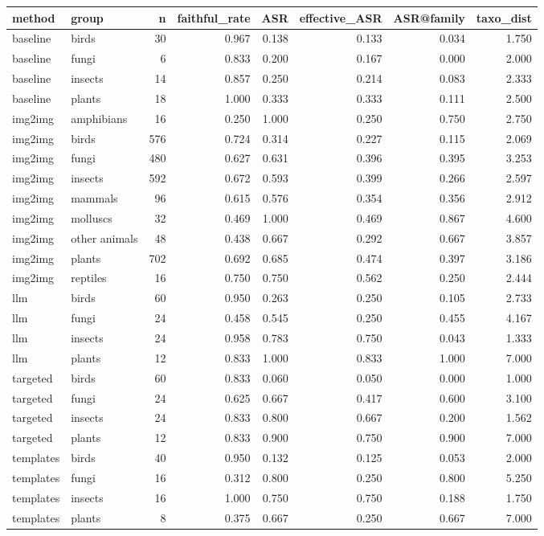 \begin{tabular}{llrrrrrr}
\toprule
method & group & n & faithful_rate & ASR & effective_ASR & ASR@family & taxo_dist \\
\midrule
baseline & birds & 30 & 0.967 & 0.138 & 0.133 & 0.034 & 1.750 \\
baseline & fungi & 6 & 0.833 & 0.200 & 0.167 & 0.000 & 2.000 \\
baseline & insects & 14 & 0.857 & 0.250 & 0.214 & 0.083 & 2.333 \\
baseline & plants & 18 & 1.000 & 0.333 & 0.333 & 0.111 & 2.500 \\
img2img & amphibians & 16 & 0.250 & 1.000 & 0.250 & 0.750 & 2.750 \\
img2img & birds & 576 & 0.724 & 0.314 & 0.227 & 0.115 & 2.069 \\
img2img & fungi & 480 & 0.627 & 0.631 & 0.396 & 0.395 & 3.253 \\
img2img & insects & 592 & 0.672 & 0.593 & 0.399 & 0.266 & 2.597 \\
img2img & mammals & 96 & 0.615 & 0.576 & 0.354 & 0.356 & 2.912 \\
img2img & molluscs & 32 & 0.469 & 1.000 & 0.469 & 0.867 & 4.600 \\
img2img & other animals & 48 & 0.438 & 0.667 & 0.292 & 0.667 & 3.857 \\
img2img & plants & 702 & 0.692 & 0.685 & 0.474 & 0.397 & 3.186 \\
img2img & reptiles & 16 & 0.750 & 0.750 & 0.562 & 0.250 & 2.444 \\
llm & birds & 60 & 0.950 & 0.263 & 0.250 & 0.105 & 2.733 \\
llm & fungi & 24 & 0.458 & 0.545 & 0.250 & 0.455 & 4.167 \\
llm & insects & 24 & 0.958 & 0.783 & 0.750 & 0.043 & 1.333 \\
llm & plants & 12 & 0.833 & 1.000 & 0.833 & 1.000 & 7.000 \\
targeted & birds & 60 & 0.833 & 0.060 & 0.050 & 0.000 & 1.000 \\
targeted & fungi & 24 & 0.625 & 0.667 & 0.417 & 0.600 & 3.100 \\
targeted & insects & 24 & 0.833 & 0.800 & 0.667 & 0.200 & 1.562 \\
targeted & plants & 12 & 0.833 & 0.900 & 0.750 & 0.900 & 7.000 \\
templates & birds & 40 & 0.950 & 0.132 & 0.125 & 0.053 & 2.000 \\
templates & fungi & 16 & 0.312 & 0.800 & 0.250 & 0.800 & 5.250 \\
templates & insects & 16 & 1.000 & 0.750 & 0.750 & 0.188 & 1.750 \\
templates & plants & 8 & 0.375 & 0.667 & 0.250 & 0.667 & 7.000 \\
\bottomrule
\end{tabular}
